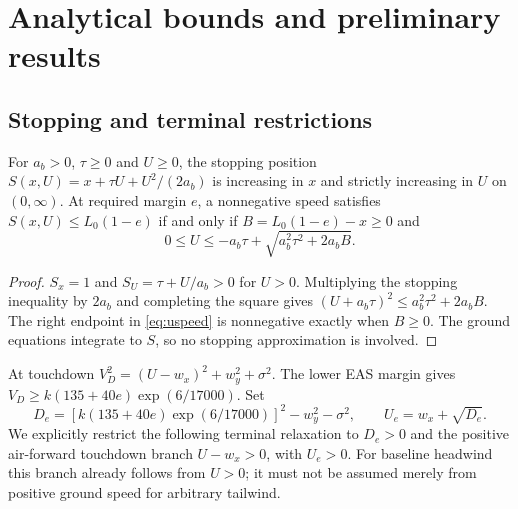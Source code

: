 \section{Analytical bounds and preliminary results}\label{sec:bounds}
\subsection{Stopping and terminal restrictions}
\begin{lemma}\label{lem:stop}
For $a_b>0$, $\tau\geq0$ and $U\geq0$, the stopping position $S(x,U)=x+\tau U+U^2/(2a_b)$ is increasing in $x$ and strictly increasing in $U$ on $(0,\infty)$. At required margin $e$, a nonnegative speed satisfies $S(x,U)\leq L_0(1-e)$ if and only if $B=L_0(1-e)-x\geq0$ and
\begin{equation}\label{eq:uspeed}
 0\leq U\leq -a_b\tau+\sqrt{a_b^2\tau^2+2a_bB}.
\end{equation}
\end{lemma}
\begin{proof}
$S_x=1$ and $S_U=\tau+U/a_b>0$ for $U>0$. Multiplying the stopping inequality by $2a_b$ and completing the square gives $(U+a_b\tau)^2\leq a_b^2\tau^2+2a_bB$. The right endpoint in \eqref{eq:uspeed} is nonnegative exactly when $B\geq0$. The ground equations integrate to $S$, so no stopping approximation is involved.
\end{proof}

At touchdown $V_D^2=(U-w_x)^2+w_y^2+\sigma^2$. The lower EAS margin gives $V_D\geq k(135+40e)\exp(6/17000)$. Set
\begin{equation}\label{eq:terminalD}
 D_e=[k(135+40e)\exp(6/17000)]^2-w_y^2-\sigma^2,
 \qquad U_e=w_x+\sqrt{D_e}.
\end{equation}
We explicitly restrict the following terminal relaxation to $D_e>0$ and the positive air-forward touchdown branch $U-w_x>0$, with $U_e>0$. For baseline headwind this branch already follows from $U>0$; it must not be assumed merely from positive ground speed for arbitrary tailwind.

